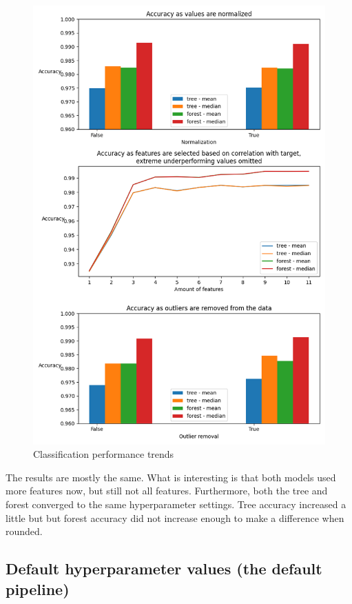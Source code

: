 \documentclass[12pt, letterpaper]{article}
\begin{document}
\begin{figure}[H]
    \centering
    \includegraphics[scale=0.7]{classification_performance_100.png}
    \caption{Classification performance trends}
    \label{cls_plt_100} %
\end{figure}

The results are mostly the same. What is interesting is that both models used more features now, but still not all features. Furthermore, both the tree and forest converged to the same hyperparameter settings. Tree accuracy increased a little but but forest accuracy did not increase enough to make a difference when rounded.

\subsection{Default hyperparameter values (the default pipeline)}
\end{document}
